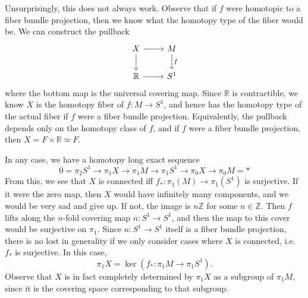 \documentclass[a4paper, 12pt]{article}
\theoremstyle{definition}
\newcommand\Z{\mathbb{Z}}
\newcommand\R{\mathbb{R}}
\begin{document}
Unsurprisingly, this does not always work. Observe that if $f$ were homotopic to a fiber bundle projection, then we know what the homotopy type of the fiber would be. We can construct the pullback
\[
  \begin{tikzcd}
    X \ar[r] \ar[d] & M \ar[d, "f"]\\
    \R \ar[r] & S^1
  \end{tikzcd}
\]
where the bottom map is the universal covering map. Since $\R$ is contractible, we know $X$ is the homotopy fiber of $f: M \to S^1$, and hence has the homotopy type of the actual fiber if $f$ were a fiber bundle projection. Equivalently, the pullback depends only on the homotopy class of $f$, and if $f$ were a fiber bundle projection, then $X = F \times \R \simeq F$.

In any case, we have a homotopy long exact sequence
\[
  0 = \pi_2S^1 \to \pi_1X \to \pi_1M \to \pi_1S^1 \to \pi_0X \to \pi_0M = *
\]
From this, we see that $X$ is connected iff $f_*: \pi_1(M) \to \pi_1(S^1)$ is surjective. If it were the zero map, then $X$ would have infinitely many components, and we would be very sad and give up. If not, the image is $n \Z$ for some $n \in \Z$. Then $f$ lifts along the $n$-fold covering map $n: S^1 \to S^1$, and then the map to this cover would be surjective on $\pi_1$. Since $n: S^1 \to S^1$ itself is a fiber bundle projection, there is no lost in generality if we only consider cases where $X$ is connected, i.e.\ $f_*$ is surjective. In this case,
\[
  \pi_1X = \ker (f_*: \pi_1 M \to \pi_1 S^1).
\]
Observe that $X$ is in fact completely determined by $\pi_1X$ as a subgroup of $\pi_1 M$, since it is the covering space corresponding to that subgroup.
\end{document}
